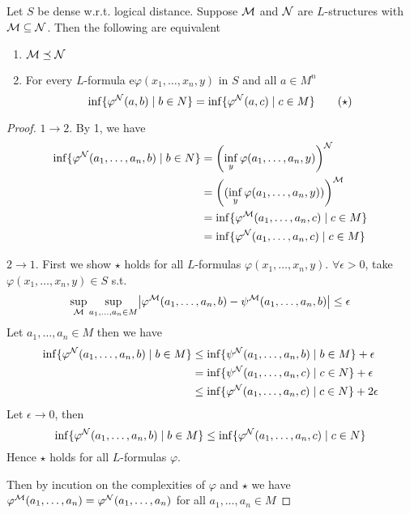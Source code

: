 \documentclass[11pt]{article}
\begin{document}
\begin{proposition}
\label{propB.1}
Let \(S\) be dense w.r.t. logical distance. Suppose \(\mathcal{M}\) and \(\mathcal{N}\) are \(L\)-structures
with \(\mathcal{M}\subseteq\mathcal{N}\). Then the following are equivalent
\begin{enumerate}
\item \(\mathcal{M}\preceq\mathcal{N}\)
\item For every \(L\)-formula e\(\varphi(x_1,\dots,x_n,y)\) in \(S\) and all \(a\in M^n\)
\begin{equation}
\inf\{\varphi^{\mathcal{N}}(a,b)\mid b\in N\}=\inf\{\varphi^{\mathcal{N}}(a,c)\mid c\in M\}\tag{$\star$}
\end{equation}
\end{enumerate}
\end{proposition}

\begin{proof}
\(1\to 2\). By 1, we have
\begin{align*}
  \inf\{\varphi^{\mathcal{N}}(a_1,\dots,a_n,b)\mid b\in N\}&=
  \left(\inf_y\varphi(a_1,\dots,a_n,y)\right)^{\mathcal{N}}\\
  &=\left((\inf_y\varphi(a_1,\dots,a_n,y))\right)^{\mathcal{M}}\\
  &=\inf\{\varphi^{\mathcal{M}}(a_1,\dots,a_n,c)\mid c\in M\}\\
  &=\inf\{\varphi^{\mathcal{N}}(a_1,\dots,a_n,c)\mid c\in M\}
\end{align*}

\(2\to1\). First we show \(\star\) holds for all \(L\)-formulas \(\varphi(x_1,\dots,x_n,y)\).
\(\forall\epsilon>0\), take \(\varphi(x_1,\dots,x_n,y)\in S\) s.t.
\begin{equation*}
  \sup_{\calm}\sup_{a_1,\dots,a_n\in M}
  \abs{\varphi^{\calm}(a_1,\dots,a_n,b)-\psi^{\calm}(a_1,\dots,a_n,b)}\le\epsilon
\end{equation*}
Let \(a_1,\dots,a_n\in M\) then we have
\begin{align*}
  \inf\{\varphi^{\mathcal{N}}(a_1,\dots,a_n,b)\mid b\in M\}&\le
  \inf\{\psi^{\mathcal{N}}(a_1,\dots,a_n,b)\mid b\in M\}+\epsilon\\
  &=\inf\{\psi^{\mathcal{N}}(a_1,\dots,a_n,c)\mid c\in N\}+\epsilon\\
  &\le\inf\{\varphi^{\mathcal{N}}(a_1,\dots,a_n,c)\mid c\in N\}+2\epsilon
\end{align*}
Let \(\epsilon\to0\), then
\begin{equation*}
  \inf\{\varphi^{\mathcal{N}}(a_1,\dots,a_n,b)\mid b\in M\}\le
  \inf\{\varphi^{\mathcal{N}}(a_1,\dots,a_n,c)\mid c\in N\}
\end{equation*}
Hence \(\star\) holds for all \(L\)-formulas \(\varphi\).

Then by incution on the complexities of \(\varphi\) and \(\star\) we have
\(\varphi^{\mathcal{M}}(a_1,\dots,a_n)=\varphi^{\mathcal{N}}(a_1,\dots,a_n)\) for all \(a_1,\dots,a_n\in M\)
\end{proof}
\end{document}
